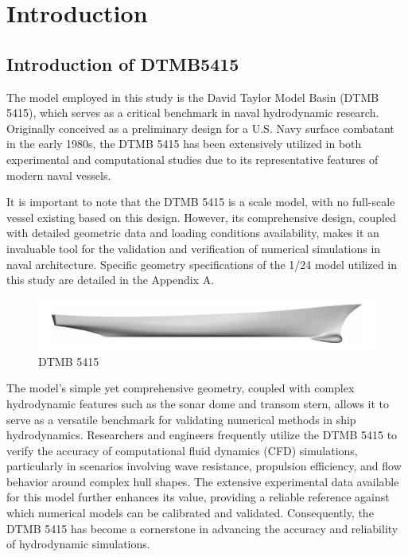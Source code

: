 \documentclass[12pt]{article} %
\begin{document}
\clearpage
\section{Introduction}

\subsection{Introduction of DTMB5415}

The model employed in this study is the David Taylor Model Basin (DTMB 5415), which serves as a 
critical benchmark in naval hydrodynamic research. Originally conceived as a preliminary design 
for a U.S. Navy surface combatant in the early 1980s, the DTMB 5415 has been extensively utilized 
in both experimental and computational studies due to its representative features of modern naval vessels\cite{elhadad2023}.


It is important to note that the DTMB 5415 is a scale model, with no full-scale vessel existing 
based on this design. However, its comprehensive design, coupled with detailed geometric data and 
loading conditions availability, makes it an invaluable tool for the validation and verification of 
numerical simulations in naval architecture. Specific geometry specifications of the 1/24 model utilized
in this study are detailed in the Appendix A.

\begin{figure}[ht]
\centering
\includegraphics[width=1\textwidth]{DTMB.png}
\caption{DTMB 5415}
\end{figure}

The model’s simple yet comprehensive geometry, coupled with complex hydrodynamic features such 
as the sonar dome and transom stern, allows it to serve as a versatile benchmark for validating 
numerical methods in ship hydrodynamics. Researchers and engineers frequently utilize the DTMB 
5415 to verify the accuracy of computational fluid dynamics (CFD) simulations, particularly in 
scenarios involving wave resistance, propulsion efficiency, and flow behavior around complex 
hull shapes\cite{elhadad2023}. The extensive experimental data available for this model further 
enhances its value, 
providing a reliable reference against which numerical models can be calibrated and validated. 
Consequently, the DTMB 5415 has become a cornerstone in advancing the accuracy and reliability of 
hydrodynamic simulations.
\end{document}
